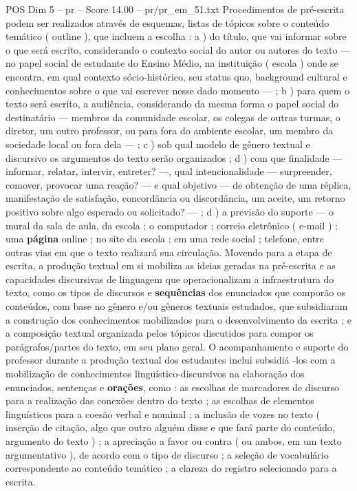 \begin{textsample}{POS Dim 5 – pr – Score 14.00 – pr/pr\_em\_51.txt}
Procedimentos de pré-escrita podem ser realizados através de esquemas, listas de tópicos sobre o conteúdo temático ( outline ), que incluem a escolha : a ) do título, que vai informar sobre o que será escrito, considerando o contexto social do autor ou autores do texto — no papel social de estudante do Ensino Médio, na instituição ( escola ) onde se encontra, em qual contexto sócio-histórico, seu status quo, background cultural e conhecimentos sobre o que vai escrever nesse dado momento — ; b ) para quem o texto será escrito, a audiência, considerando da mesma forma o papel social do destinatário — membros da comunidade escolar, os colegas de outras turmas, o diretor, um outro professor, ou para fora do ambiente escolar, um membro da sociedade local ou fora dela — ; c ) sob qual modelo de gênero textual e discursivo os argumentos do texto serão organizados ; d ) com que finalidade — informar, relatar, intervir, entreter? —, qual intencionalidade — surpreender, comover, provocar uma reação? — e qual objetivo — de obtenção de uma réplica, manifestação de satisfação, concordância ou discordância, um aceite, um retorno positivo sobre algo esperado ou solicitado? — ; d ) a previsão do suporte — o mural da sala de aula, da escola ; o computador ; correio eletrônico ( e-mail ) ; uma \textbf{página} online ; no site da escola ; em uma rede social ; telefone, entre outras vias em que o texto realizará sua circulação.
Movendo para a etapa de escrita, a produção textual em si mobiliza as ideias geradas na pré-escrita e as capacidades discursivas de linguagem que operacionalizam a infraestrutura do texto, como os tipos de discursos e \textbf{sequências} dos enunciados que comporão os conteúdos, com base no gênero e/ou gêneros textuais estudados, que subsidiaram a construção dos conhecimentos mobilizados para o desenvolvimento da escrita ; e a composição textual organizada pelos tópicos discutidos para compor os parágrafos/partes do texto, em seu plano geral.
O acompanhamento e suporte do professor durante a produção textual dos estudantes inclui subsidiá -los com a mobilização de conhecimentos linguístico-discursivos na elaboração dos enunciados, sentenças e \textbf{orações}, como : as escolhas de marcadores de discurso para a realização das conexões dentro do texto ; as escolhas de elementos linguísticos para a coesão verbal e nominal ; a inclusão de vozes no texto ( inserção de citação, algo que outro alguém disse e que fará parte do conteúdo, argumento do texto ) ; a apreciação a favor ou contra ( ou ambos, em um texto argumentativo ), de acordo com o tipo de discurso ; a seleção de vocabulário correspondente ao conteúdo temático ; a clareza do registro selecionado para a escrita.

\end{textsample}
